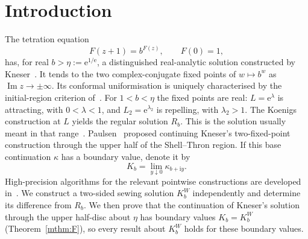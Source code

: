 \documentclass[11pt]{amsart}
\theoremstyle{definition}
\newcommand{\Rr}{R}
\newcommand{\Kk}{K}
\newcommand{\eee}{\mathrm{e}}
\newcommand{\ii}{\mathrm{i}}
\begin{document}
\begin{abstract}
adding to the model time a correction that is holomorphic in the parameter and
makes the one-step error vanish to high order at both fixed points.  The
numerically evaluated first-mode deficit is $0.010199006345897\,p$,
and it matches fits from the hyperbolic side to
eleven digits.  The same method gives an asymptotic expansion
to all orders in $p$, with every coefficient built from convergent parabolic
series.  Independent ladder computations of a two-sided numerical solution agree with the
transition-map prediction to eight digits, arguments included.  An independent
implementation of a two-sided regular construction (\texttt{fatou.gp})
coincides with the sewing solution to $40$ digits at four complex bases, two of
them near $(1,\eta)$.  That pointwise comparison is independent of the
continuation argument.
An interval-certified quasiconformal argument separately extends the
exterior Kneser family across a non-cusp boundary subarc on a common
complex neighbourhood of the full height segment $[0,1]$.
\end{abstract}

\maketitle

\section{Introduction}\label{sec:intro}

The tetration equation
\begin{equation}\label{eq:abel}
  F(z+1)=b^{F(z)},\qquad F(0)=1,
\end{equation}
has, for real $b>\eta:=\eee^{1/\eee}$, a distinguished real-analytic solution
constructed by Kneser~\cite{Kneser1950}.  It tends to the two complex-conjugate
fixed points of $w\mapsto b^w$ as $\operatorname{Im}z\to\pm\infty$.
Its conformal uniformisation is uniquely characterised by the
initial-region criterion of~\cite{TrappmannKouznetsov2011}.  For
$1<b<\eta$ the fixed points are real: $L=\eee^\lambda$ is attracting, with
$0<\lambda<1$, and $L_2=\eee^{\lambda_2}$ is repelling, with $\lambda_2>1$.  The
Koenigs construction at $L$ yields the regular solution $\Rr_b$.  This is the
solution usually meant in that range~\cite{KouznetsovTrappmann2010}.
Paulsen~\cite{Paulsen2019} proposed continuing Kneser's two-fixed-point
construction through the upper half of the Shell--Thron region.  If this
base continuation $\kappa$ has a boundary value, denote it by
\begin{equation}\label{eq:K}
  \Kk_b=\lim_{y\downarrow0}\kappa_{b+\ii y}.
\end{equation}
High-precision algorithms for the relevant pointwise constructions are
developed in~\cite{Kouznetsov2009,KouznetsovTrappmann2010,KouznetsovTrappmann2012}.
We construct a two-sided sewing solution $\Kk^W_b$ independently and
determine its difference from $\Rr_b$.  We then prove that the
continuation of Kneser's solution through the upper half-disc about
$\eta$ has boundary values $\Kk_b=\Kk^W_b$ (Theorem~\ref{mthm:F}), so every
result about $\Kk^W_b$ holds for these boundary values.
\end{document}
